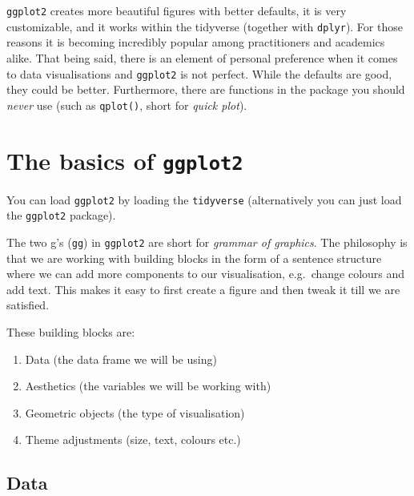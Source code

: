\documentclass[12pt,oneside]{reedthesis}
\providecommand{\tightlist}{%
  \setlength{\itemsep}{0pt}\setlength{\parskip}{0pt}}
\theoremstyle{definition}
\theoremstyle{definition}
\theoremstyle{definition}
\theoremstyle{remark}
\begin{document}
  \texttt{ggplot2} creates more beautiful figures with better defaults, it
  is very customizable, and it works within the tidyverse (together with
  \texttt{dplyr}). For those reasons it is becoming incredibly popular
  among practitioners and academics alike. That being said, there is an
  element of personal preference when it comes to data visualisations and
  \texttt{ggplot2} is not perfect. While the defaults are good, they could
  be better. Furthermore, there are functions in the package you should
  \emph{never} use (such as \texttt{qplot()}, short for \emph{quick
  plot}).
  
  \section{\texorpdfstring{The basics of
  \texttt{ggplot2}}{The basics of ggplot2}}\label{the-basics-of-ggplot2}
  
  You can load \texttt{ggplot2} by loading the \texttt{tidyverse}
  (alternatively you can just load the \texttt{ggplot2} package).
  \begin{Shaded}
  \begin{Highlighting}[]
  \NormalTok{(}\NormalTok{)}
  \end{Highlighting}
  \end{Shaded}
  The two g's (\texttt{gg}) in \texttt{ggplot2} are short for
  \emph{grammar of graphics}. The philosophy is that we are working with
  building blocks in the form of a sentence structure where we can add
  more components to our visualisation, e.g.~change colours and add text.
  This makes it easy to first create a figure and then tweak it till we
  are satisfied.
  
  These building blocks are:
  \begin{enumerate}
  \def\labelenumi{\arabic{enumi}.}
  \tightlist
  \item
    Data (the data frame we will be using)
  \item
    Aesthetics (the variables we will be working with)
  \item
    Geometric objects (the type of visualisation)
  \item
    Theme adjustments (size, text, colours etc.)
  \end{enumerate}
  \subsection{Data}\label{data}
  
\end{document}
